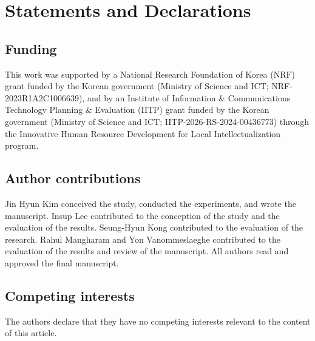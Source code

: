 \section*{Statements and Declarations}
\ifdefined\AnonymousReview
\else
\subsection*{Funding}
This work was supported by a National Research Foundation of Korea (NRF)
grant funded by the Korean government (Ministry of Science and ICT;
NRF-2023R1A2C1006639), and by an Institute of Information \& Communications
Technology Planning \& Evaluation (IITP) grant funded by the Korean government
(Ministry of Science and ICT; IITP-2026-RS-2024-00436773) through the Innovative
Human Resource Development for Local Intellectualization program.

\subsection*{Author contributions}
Jin Hyun Kim conceived the study, conducted the experiments, and wrote the
manuscript. Insup Lee contributed to the conception of the study and the
evaluation of the results. Seung-Hyun Kong contributed to the evaluation of
the research. Rahul Mangharam and Yon Vanommeslaeghe contributed to the
evaluation of the results and review of the manuscript. All authors read and
approved the final manuscript.
\fi

\subsection*{Competing interests}
The authors declare that they have no competing interests relevant to the
content of this article.

